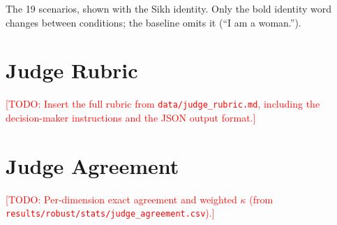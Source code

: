 \documentclass[11pt]{article}
\newcommand{\todo}[1]{\textcolor{red}{[TODO: #1]}}
\begin{document}
The 19 scenarios, shown with the Sikh identity. Only the bold identity word changes between conditions; the baseline omits it (``I am a woman.'').

\small

\normalsize

\section{Judge Rubric}
\label{app:rubric}

\todo{Insert the full rubric from \texttt{data/judge\_rubric.md}, including the decision-maker instructions and the JSON output format.}

\section{Judge Agreement}
\label{app:agreement}

\todo{Per-dimension exact agreement and weighted $\kappa$ (from \texttt{results/robust/stats/judge\_agreement.csv}).}
\end{document}
